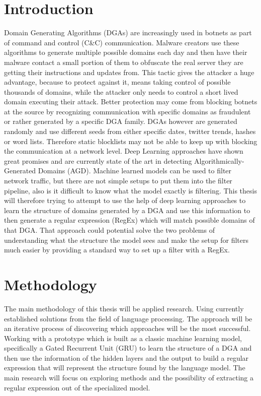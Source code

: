\documentclass[a4paper, 12pt]{article}
\begin{document}
\section{Introduction}
Domain Generating Algorithms (DGAs) are increasingly used in botnets as part of
command and control (C\&C) communication. Malware creators use these algorithms
to generate multiple possible domains each day and then have their malware
contact a small portion of them to obfuscate the real server they are getting
their instructions and updates from. This tactic gives the attacker a huge
advantage, because to protect against it, means taking control of possible thousands
of domains, while the attacker only needs to control a short lived domain
executing their attack. Better protection may come from blocking
botnets at the source by recognizing communication with specific domains as
fraudulent or rather generated by a specific DGA family. DGAs however are
generated randomly and use different seeds from either specific dates, twitter
trends, hashes or word lists. Therefore static blocklists may not be able to
keep up with blocking the communication at a network level. Deep Learning
approaches have shown great promises and are currently state of the art in
detecting Algorithmically-Generated Domains (AGD). 
Machine learned models can be used to filter network traffic, but there are not simple setups to put
them into the filter pipeline, also is it difficult to know what the model exactly is filtering.
This thesis will therefore trying to attempt to use the help of deep learning approaches  to learn the structure
of domains generated by a DGA and use this information to then generate a regular expression (RegEx) 
which will match possible domains of that DGA. That approach could potential solve the two problems
of understanding what the structure the model sees and make the setup for filters much easier by
providing a standard way to set up a filter with a RegEx.


\section{Methodology}
The main methodology of this thesis will be applied research. Using currently established solutions
from the field of language processing. The approach will be an iterative process of discovering
which approaches will be the most successful. Working with a prototype which is built as a classic
machine learning model, specifically a Gated Recurrent Unit (GRU) to learn the structure of a DGA
and then use the information of the hidden layers and the output to build a regular expression that
will represent the structure found by the language model. The main research will focus on exploring
methods and the possibility of extracting a regular expression out of the specialized model. 
\end{document}
